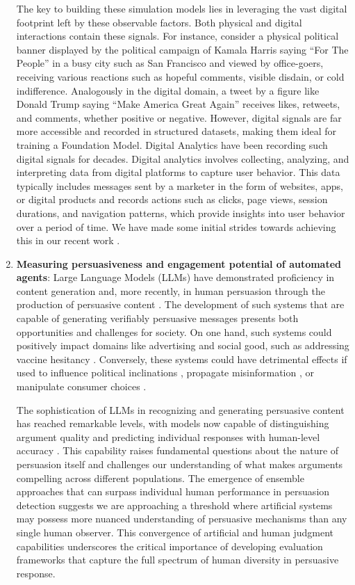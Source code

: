 \begin{enumerate}
    The key to building these simulation models lies in leveraging the vast digital footprint left by these observable factors. Both physical and digital interactions contain these signals. For instance, consider a physical political banner displayed by the political campaign of Kamala Harris saying ``For The People'' in a busy city such as San Francisco and viewed by office-goers, receiving various reactions such as hopeful comments, visible disdain, or cold indifference. Analogously in the digital domain, a tweet by a figure like Donald Trump saying ``Make America Great Again'' receives likes, retweets, and comments, whether positive or negative. However, digital signals are far more accessible and recorded in structured datasets, making them ideal for training a Foundation Model. Digital Analytics have been recording such digital signals for decades. Digital analytics involves collecting, analyzing, and interpreting data from digital platforms to capture user behavior. This data typically includes messages sent by a marketer in the form of websites, apps, or digital products and records actions such as clicks, page views, session durations, and navigation patterns, which provide insights into user behavior over a period of time. We have made some initial strides towards achieving this in our recent work \cite{bhattacharyyasocia2024}.


    \item \textbf{Measuring persuasiveness and engagement potential of automated agents}: Large Language Models (LLMs) have demonstrated proficiency in content generation and, more recently, in human persuasion through the production of persuasive content \cite{durmus2024persuasion,singh2024measuring}. The development of such systems that are capable of generating verifiably persuasive messages presents both opportunities and challenges for society. On one hand, such systems could positively impact domains like advertising and social good, such as addressing vaccine hesitancy \cite{sekar2021domestic,PRWeek_DefeatDespairCOVID19}. Conversely, these systems could have detrimental effects if used to influence political inclinations \cite{tappin2023quantifying}, propagate misinformation \cite{lukito2020coordinating}, or manipulate consumer choices \cite{boerman2017online}.

    The sophistication of LLMs in recognizing and generating persuasive content has reached remarkable levels, with models now capable of distinguishing argument quality and predicting individual responses with human-level accuracy \cite{rescala2024can}. This capability raises fundamental questions about the nature of persuasion itself and challenges our understanding of what makes arguments compelling across different populations. The emergence of ensemble approaches that can surpass individual human performance in persuasion detection suggests we are approaching a threshold where artificial systems may possess more nuanced understanding of persuasive mechanisms than any single human observer. This convergence of artificial and human judgment capabilities \cite{santurkar2023whose} underscores the critical importance of developing evaluation frameworks that capture the full spectrum of human diversity in persuasive response.


\end{enumerate}
